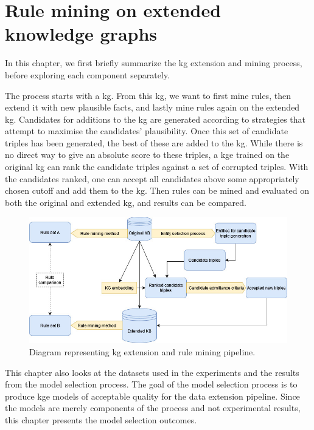 \chapter{Rule mining on extended knowledge graphs}
In this chapter, we first briefly summarize the \gls{kg} extension and mining process, before exploring each component separately.

The process starts with a \gls{kg}. From this \gls{kg}, we want to first mine rules, then extend it with new plausible facts, and lastly mine rules again on the extended \gls{kg}. Candidates for additions to the \gls{kg} are generated according to strategies that attempt to maximise the candidates’ plausibility. Once this set of candidate triples has been generated, the best of these are added to the \gls{kg}. While there is no direct way to give an absolute score to these triples, a \gls{kge} trained on the original \gls{kg} can rank the candidate triples against a set of corrupted triples. With the candidates ranked, one can accept all candidates above some appropriately chosen cutoff and add them to the \gls{kg}. Then rules can be mined and evaluated on both the original and extended \gls{kg}, and results can be compared.

\begin{figure}[htp]
    \centering
    \includegraphics[width=16cm]{figures/ontology_mining_pipeline.jpg}
    \caption[Experiment pipeline diagram.]{Diagram representing \gls{kg} extension and rule mining pipeline.}
\end{figure}

This chapter also looks at the datasets used in the experiments and the results from the model selection process. The goal of the model selection process is to produce \gls{kge} models of acceptable quality for the data extension pipeline. Since the models are merely components of the process and not experimental results, this chapter presents the model selection outcomes.

